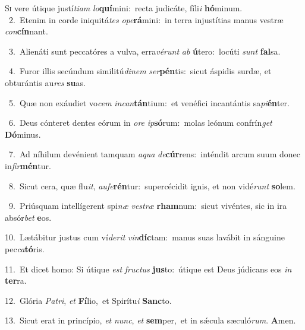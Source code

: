 \lettrine{\initial\textcolor{\initialcolor}{S}}{i} vere útique justí\-\textit{ti}\-\textit{am} \textit{lo}\-\textbf{quí}mini:~\star recta judicáte, fíli\textit{i} \textbf{hó}\-minum.\\
{\numbfont\textcolor{\numbcolor}{~2.}}~Etenim in corde iniquitá\textit{tes} \textit{o}\-\textit{pe}\textbf{rá}mini:~\star in terra injustítias manus vestræ \textit{con}\-\textbf{cín}nant.\par
{\numbfont\textcolor{\numbcolor}{~3.}}~Alienáti sunt peccatóres a vulva, erra\-\textit{vé}\-\textit{runt} \textit{ab} \textbf{ú}\-tero:~\star locúti \textit{sunt} \textbf{fal}\-sa.\par
{\numbfont\textcolor{\numbcolor}{~4.}}~Furor illis secúndum similitú\-\textit{di}\-\textit{nem} \textit{ser}\-\textbf{pén}tis:~\star sicut áspidis surdæ, et obturántis au\textit{res} \textbf{su}\-as.\par
{\numbfont\textcolor{\numbcolor}{~5.}}~Quæ non exáudiet vo\textit{cem} \textit{in}\-\textit{can}\textbf{tán}tium:~\star et venéfici incantántis sa\-\textit{pi}\-\textbf{én}ter.\par
{\numbfont\textcolor{\numbcolor}{~6.}}~Deus cónteret dentes eórum in \textit{o}\-\textit{re} \textit{ip}\-\textbf{só}rum:~\star molas leónum confrín\textit{get} \textbf{Dó}\-minus.\par
{\numbfont\textcolor{\numbcolor}{~7.}}~Ad níhilum devénient tamquam \textit{a}\-\textit{qua} \textit{de}\-\textbf{cúr}rens:~\star inténdit arcum suum donec in\-\textit{fir}\-\textbf{mén}tur.\par
{\numbfont\textcolor{\numbcolor}{~8.}}~Sicut cera, quæ flu\-\textit{it}\-, \textit{au}\-\textit{fe}\textbf{rén}tur:~\star supercécidit ignis, et non vidé\textit{runt} \textbf{so}\-lem.\par
{\numbfont\textcolor{\numbcolor}{~9.}}~Priúsquam intellígerent spi\textit{næ} \textit{ves}\-\textit{træ} \textbf{rham}\-num:~\star sicut vivéntes, sic in ira absór\textit{bet} \textbf{e}\-os.\par
{\numbfont\textcolor{\numbcolor}{10.}}~Lætábitur justus cum ví\-\textit{de}\-\textit{rit} \textit{vin}\-\textbf{díc}tam:~\star manus suas lavábit in sánguine pec\-\textit{ca}\-\textbf{tó}ris.\par
{\numbfont\textcolor{\numbcolor}{11.}}~Et dicet homo: Si útique \textit{est} \textit{fruc}\-\textit{tus} \textbf{jus}\-to:~\star útique est Deus júdicans eos \textit{in} \textbf{ter}\-ra.\par
{\numbfont\textcolor{\numbcolor}{12.}}~Glória \textit{Pa}\-\textit{tri}, \textit{et} \textbf{Fí}\-lio,~\star et Spirítu\textit{i} \textbf{Sanc}\-to.\par
{\numbfont\textcolor{\numbcolor}{13.}}~Sicut erat in princípio, \textit{et} \textit{nunc}\-, \textit{et} \textbf{sem}\-per,~\star et in sǽcula sæculó\-\textit{rum}\-. \textbf{A}\-men.\par
